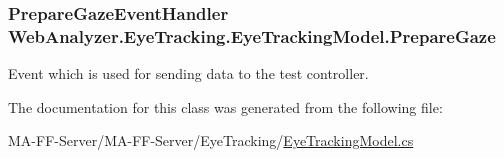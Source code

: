 \subsubsection[{Prepare\+Gaze}]{\setlength{\rightskip}{0pt plus 5cm}Prepare\+Gaze\+Event\+Handler Web\+Analyzer.\+Eye\+Tracking.\+Eye\+Tracking\+Model.\+Prepare\+Gaze}\label{class_web_analyzer_1_1_eye_tracking_1_1_eye_tracking_model_a170dd57ad1784737ddf34dc14f82293d}


Event which is used for sending data to the test controller. 



The documentation for this class was generated from the following file\+:\begin{DoxyCompactItemize}
\item 
M\+A-\/\+F\+F-\/\+Server/\+M\+A-\/\+F\+F-\/\+Server/\+Eye\+Tracking/\hyperlink{_eye_tracking_model_8cs}{Eye\+Tracking\+Model.\+cs}\end{DoxyCompactItemize}
